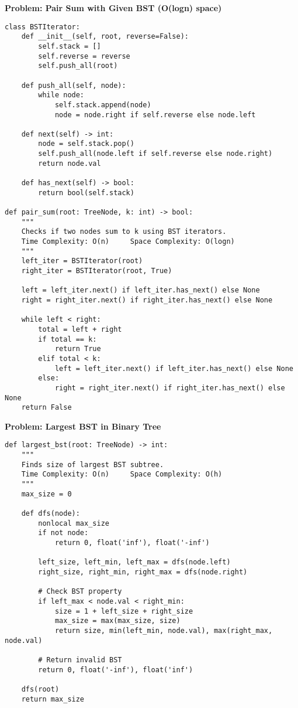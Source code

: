 \noindent\textbf{Problem: Pair Sum with Given BST (O(logn) space)}
\begin{verbatim}
class BSTIterator:
    def __init__(self, root, reverse=False):
        self.stack = []
        self.reverse = reverse
        self.push_all(root)
    
    def push_all(self, node):
        while node:
            self.stack.append(node)
            node = node.right if self.reverse else node.left
    
    def next(self) -> int:
        node = self.stack.pop()
        self.push_all(node.left if self.reverse else node.right)
        return node.val
    
    def has_next(self) -> bool:
        return bool(self.stack)

def pair_sum(root: TreeNode, k: int) -> bool:
    """
    Checks if two nodes sum to k using BST iterators.
    Time Complexity: O(n)     Space Complexity: O(logn)
    """
    left_iter = BSTIterator(root)
    right_iter = BSTIterator(root, True)
    
    left = left_iter.next() if left_iter.has_next() else None
    right = right_iter.next() if right_iter.has_next() else None
    
    while left < right:
        total = left + right
        if total == k:
            return True
        elif total < k:
            left = left_iter.next() if left_iter.has_next() else None
        else:
            right = right_iter.next() if right_iter.has_next() else None
    return False
\end{verbatim}

\noindent\textbf{Problem: Largest BST in Binary Tree}
\begin{verbatim}
def largest_bst(root: TreeNode) -> int:
    """
    Finds size of largest BST subtree.
    Time Complexity: O(n)     Space Complexity: O(h)
    """
    max_size = 0
    
    def dfs(node):
        nonlocal max_size
        if not node:
            return 0, float('inf'), float('-inf')
        
        left_size, left_min, left_max = dfs(node.left)
        right_size, right_min, right_max = dfs(node.right)
        
        # Check BST property
        if left_max < node.val < right_min:
            size = 1 + left_size + right_size
            max_size = max(max_size, size)
            return size, min(left_min, node.val), max(right_max, node.val)
        
        # Return invalid BST
        return 0, float('-inf'), float('inf')
    
    dfs(root)
    return max_size
\end{verbatim}



